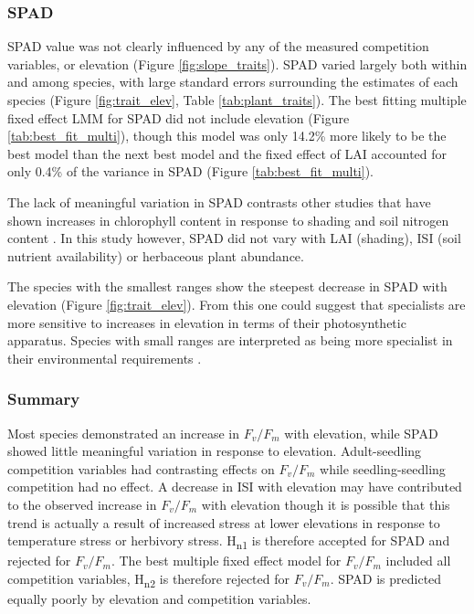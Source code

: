 \documentclass[a4paper, 11pt]{article}
\begin{document}
\subsubsection*{SPAD}
SPAD value was not clearly influenced by any of the measured competition variables, or elevation (Figure \ref{fig:slope_traits}). SPAD varied largely both within and among species, with large standard errors surrounding the estimates of each species (Figure \ref{fig:trait_elev}, Table \ref{tab:plant_traits}). The best fitting multiple fixed effect LMM for SPAD did not include elevation (Figure \ref{tab:best_fit_multi}), though this model was only 14.2\% more likely to be the best model than the next best model and the fixed effect of LAI accounted for only 0.4\% of the variance in SPAD (Figure \ref{tab:best_fit_multi}). 

The lack of meaningful variation in SPAD contrasts other studies that have shown increases in chlorophyll content in response to shading \citep{Brand1997, Rijkers2000, Rozendaal2006, Dai2009, Zervoudakis2012} and soil nitrogen content \citep{Cechin2004}. In this study however, SPAD did not vary with LAI (shading), ISI (soil nutrient availability) or herbaceous plant abundance. 

The species with the smallest ranges show the steepest decrease in SPAD with elevation (Figure \ref{fig:trait_elev}). From this one could suggest that specialists are more sensitive to increases in elevation in terms of their photosynthetic apparatus. Species with small ranges are interpreted as being more specialist in their environmental requirements \citep{Thuiller2005}.

\subsubsection*{Summary}
Most species demonstrated an increase in $F_v/F_m$ with elevation, while SPAD showed little meaningful variation in response to elevation. Adult-seedling competition variables had contrasting effects on $F_v/F_m$ while seedling-seedling competition had no effect. A decrease in ISI with elevation may have contributed to the observed increase in $F_v/F_m$ with elevation though it is possible that this trend is actually a result of increased stress at lower elevations in response to temperature stress or herbivory stress. H\textsubscript{n1} is therefore accepted for SPAD and rejected for $F_v/F_m$. The best multiple fixed effect model for $F_v/F_m$ included all competition variables, H\textsubscript{n2} is therefore rejected for $F_v/F_m$. SPAD is predicted equally poorly by elevation and competition variables.
\end{document}
